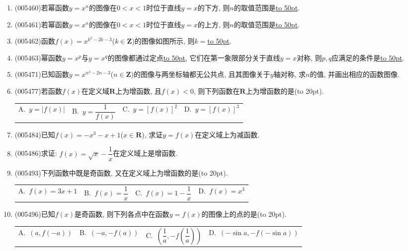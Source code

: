 \documentclass[10pt,a4paper]{article}
\newcommand{\blank}[1]{\underline{\hbox to #1pt{}}}
\newcommand{\bracket}[1]{(\hbox to #1pt{})}
\newcommand{\fourch}[4]{\par\begin{tabular}{p{.23\textwidth}p{.23\textwidth}p{.23\textwidth}p{.23\textwidth}}
A.~#1 &B.~#2& C.~#3& D.~#4
\end{tabular}}
\begin{document}
\begin{enumerate}[1.]
\begin{center}
\end{center}
\item {\tiny (005460)}若幂函数$y=x^n$的图像在$0<x<1$时位于直线$y=x$的下方, 则$n$的取值范围是\blank{50}.
\item {\tiny (005461)}若幂函数$y=x^n$的图像在$0<x<1$时位于直线$y=x$的上方, 则$n$的取值范围是\blank{50}.
\item {\tiny (005462)}函数$f(x)=x^{k^2-2k-3}$($k\in \mathbf{Z}$)的图像如图所示, 则$k=$\blank{50}.
\begin{center}
\end{center}
\item {\tiny (005463)}幂函数$y=x^p$与$y=x^q$的图像都通过定点\blank{50}, 它们在第一象限部分关于直线$y=x$对称, 则$p,q$应满足的条件是\blank{50}.
\item {\tiny (005471)}已知函数$y=x^{n^2-2n-3}$($n\in \mathbf{Z}$)的图像与两坐标轴都无公共点, 且其图像关于$y$轴对称, 求$n$的值, 并画出相应的函数图像.
\item {\tiny (005477)}若函数$f(x)$在定义域$\mathbf{R}$上为增函数, 且$f(x)<0$, 则下列函数在$\mathbf{R}$上为增函数的是\bracket{20}.
\fourch{$y=|f(x)|$}{$y=\dfrac 1{f(x)}$}{$y=[ f(x) ]^2$}{$y=[ f(x) ]^3$}
\item {\tiny (005484)}已知$f(x)=-x^3-x+1$($x\in \mathbf{R}$), 求证$y=f(x)$在定义域上为减函数.
\item {\tiny (005486)}求证: $f(x)=\sqrt x-\dfrac 1x$在定义域上是增函数.
\item {\tiny (005493)}下列函数中既是奇函数, 又在定义域上为增函数的是\bracket{20}.
\fourch{$f(x)=3x+1$}{$f(x)=\dfrac 1x$}{$f(x)=1-\dfrac 1x$}{$f(x)=x^3$}
\item {\tiny (005496)}已知$f(x)$是奇函数, 则下列各点中在函数$y=f(x)$的图像上的点的是\bracket{20}.
\fourch{$(a,f(-a))$}{$(-a,-f(a))$}{$(\dfrac 1a,-f(\dfrac 1a))$}{$(-\sin a,-f(-\sin a))$}

\end{enumerate}
\end{document}
